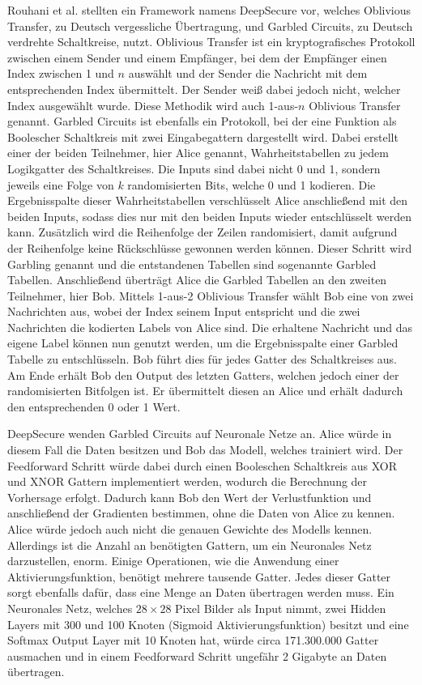 Rouhani et al. \cite{P-71} stellten ein Framework namens DeepSecure vor, welches Oblivious Transfer, zu Deutsch vergessliche Übertragung, und Garbled Circuits, zu Deutsch verdrehte Schaltkreise, nutzt.
Oblivious Transfer ist ein kryptografisches Protokoll zwischen einem Sender und einem Empfänger, bei dem der Empfänger einen Index zwischen 1 und $n$ auswählt und der Sender die Nachricht mit dem entsprechenden Index übermittelt. 
Der Sender weiß dabei jedoch nicht, welcher Index ausgewählt wurde.
Diese Methodik wird auch 1-aus-$n$ Oblivious Transfer genannt.
Garbled Circuits ist ebenfalls ein Protokoll, bei der eine Funktion als Boolescher Schaltkreis mit zwei Eingabegattern dargestellt wird.
Dabei erstellt einer der beiden Teilnehmer, hier Alice genannt, Wahrheitstabellen zu jedem Logikgatter des Schaltkreises. 
Die Inputs sind dabei nicht 0 und 1, sondern jeweils eine Folge von $k$ randomisierten Bits, welche 0 und 1 kodieren.
Die Ergebnisspalte dieser Wahrheitstabellen verschlüsselt Alice anschließend mit den beiden Inputs, sodass dies nur mit den beiden Inputs wieder entschlüsselt werden kann. 
Zusätzlich wird die Reihenfolge der Zeilen randomisiert, damit aufgrund der Reihenfolge keine Rückschlüsse gewonnen werden können. 
Dieser Schritt wird Garbling genannt und die entstandenen Tabellen sind sogenannte Garbled Tabellen.
Anschließend überträgt Alice die Garbled Tabellen an den zweiten Teilnehmer, hier Bob.
Mittels 1-aus-2 Oblivious Transfer wählt Bob eine von zwei Nachrichten aus, wobei der Index seinem Input entspricht und die zwei Nachrichten die kodierten Labels von Alice sind.
Die erhaltene Nachricht und das eigene Label können nun genutzt werden, um die Ergebnisspalte einer Garbled Tabelle zu entschlüsseln.
Bob führt dies für jedes Gatter des Schaltkreises aus.
Am Ende erhält Bob den Output des letzten Gatters, welchen jedoch einer der randomisierten Bitfolgen ist. 
Er übermittelt diesen an Alice und erhält dadurch den entsprechenden 0 oder 1 Wert.

DeepSecure wenden Garbled Circuits auf Neuronale Netze an.
Alice würde in diesem Fall die Daten besitzen und Bob das Modell, welches trainiert wird.
Der Feedforward Schritt würde dabei durch einen Booleschen Schaltkreis aus XOR und XNOR Gattern implementiert werden, wodurch die Berechnung der Vorhersage erfolgt.
Dadurch kann Bob den Wert der Verlustfunktion und anschließend der Gradienten bestimmen, ohne die Daten von Alice zu kennen.
Alice würde jedoch auch nicht die genauen Gewichte des Modells kennen.
Allerdings ist die Anzahl an benötigten Gattern, um ein Neuronales Netz darzustellen, enorm.
Einige Operationen, wie die Anwendung einer Aktivierungsfunktion, benötigt mehrere tausende Gatter.
Jedes dieser Gatter sorgt ebenfalls dafür, dass eine Menge an Daten übertragen werden muss.
Ein Neuronales Netz, welches $28\times28$ Pixel Bilder als Input nimmt, zwei Hidden Layers mit 300 und 100 Knoten (Sigmoid Aktivierungsfunktion) besitzt und eine Softmax Output Layer mit 10 Knoten hat, würde circa 171.300.000 Gatter ausmachen und in einem Feedforward Schritt ungefähr 2 Gigabyte an Daten übertragen.